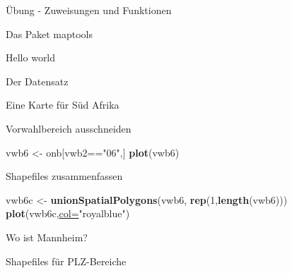 \documentclass[ignorenonframetext,]{beamer}
\newenvironment{Shaded}{\begin{snugshade}}{\end{snugshade}}
\newcommand{\DataTypeTok}[1]{\textcolor[rgb]{0.74,0.68,0.62}{\underline{#1}}}
\newcommand{\DecValTok}[1]{\textcolor[rgb]{0.27,0.67,0.26}{#1}}
\newcommand{\KeywordTok}[1]{\textcolor[rgb]{0.26,0.66,0.93}{\textbf{#1}}}
\newcommand{\NormalTok}[1]{\textcolor[rgb]{0.74,0.68,0.62}{#1}}
\newcommand{\OperatorTok}[1]{\textcolor[rgb]{0.74,0.68,0.62}{#1}}
\newcommand{\StringTok}[1]{\textcolor[rgb]{0.02,0.61,0.04}{#1}}
\begin{document}
\begin{frame}[fragile]{Übung - Zuweisungen und Funktionen}
\begin{frame}[fragile]{Das Paket maptools}
\begin{frame}[fragile]{Hello world}
\begin{frame}[fragile]{Der Datensatz}
\begin{frame}[fragile]{Eine Karte für Süd Afrika}
\begin{frame}[fragile]{Vorwahlbereich ausschneiden}
\begin{Shaded}
\begin{Highlighting}[]
\NormalTok{vwb6 <-}\StringTok{ }\NormalTok{onb[vwb2}\OperatorTok{==}\StringTok{"06"}\NormalTok{,]}
\KeywordTok{plot}\NormalTok{(vwb6)}
\end{Highlighting}
\end{Shaded}

\end{frame}

\begin{frame}[fragile]{Shapefiles zusammenfassen}
\protect\hypertarget{shapefiles-zusammenfassen}{}

\begin{Shaded}
\begin{Highlighting}[]
\NormalTok{vwb6c <-}\StringTok{ }\KeywordTok{unionSpatialPolygons}\NormalTok{(vwb6,}
              \KeywordTok{rep}\NormalTok{(}\DecValTok{1}\NormalTok{,}\KeywordTok{length}\NormalTok{(vwb6)))}
\KeywordTok{plot}\NormalTok{(vwb6c,}\DataTypeTok{col=}\StringTok{"royalblue"}\NormalTok{)}
\end{Highlighting}
\end{Shaded}

\end{frame}

\begin{frame}[fragile]{Wo ist Mannheim?}
\protect\hypertarget{wo-ist-mannheim}{}

\begin{Shaded}
\end{Shaded}

\end{frame}

\begin{frame}{Shapefiles für PLZ-Bereiche}
\protect\hypertarget{shapefiles-fur-plz-bereiche}{}


\end{frame}
\end{frame}
\end{frame}
\end{frame}
\end{frame}
\end{frame}
\end{document}
